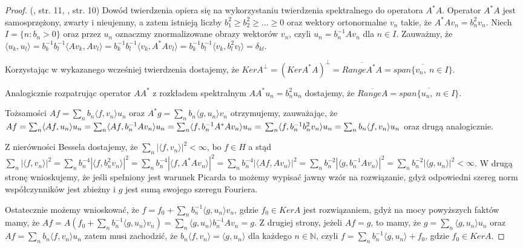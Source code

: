 \documentclass[man,mfiu]{mgrwms}
\begin{document}
\begin{proof}(\cite{kaipo}, str. 11, \cite{szkutnik}, str. 10) Dowód twierdzenia opiera się na wykorzystaniu twierdzenia spektralnego do operatora $A^*A$. Operator $A^*A$ jest samosprzężony, zwarty i nieujemny, a zatem istnieją liczby $b_1^2\geq b_2^2\geq\dots\geq 0$ oraz wektory ortonormalne $v_n$ takie, że $A^*Av_n=b_n^2v_n$. Niech $I=\{n\colon b_n>0\}$ oraz przez $u_n$ oznaczmy znormalizowane obrazy wektorów $v_n$, czyli $u_n=b_n^{-1}Av_n$ dla $n\in I$. Zauważmy, że $\langle u_k,u_l\rangle=b_k^{-1}b_l^{-1}\langle Av_k, Av_l\rangle=b_k^{-1}b_l^{-1}\langle v_k,A^*Av_l\rangle=b_k^{-1}b_l^{-1}\langle v_k,b_l^2v_l\rangle=\delta_{kl}$.

Korzystając w wykazanego wcześniej twierdzenia dostajemy, że $KerA^{\perp}=(KerA^*A)^{\perp}=\overline{RangeA^*A}=\overline{span\{v_n,\ n\in I\}}$.

Analogicznie rozpatrując operator $AA^*$ z rozkładem spektralnym $AA^*u_n=b_n^2u_n$ dostajemy, że $\overline{RangeA}=\overline{span\{u_n,\ n\in I\}}$.

Tożsamości $Af=\sum_nb_n\langle f, v_n\rangle u_n$ oraz $A^*g=\sum_nb_n\langle g, u_n\rangle v_n$ otrzymujemy, zauważając, że
$Af=\sum_n\langle Af,u_n\rangle u_n=\sum_n\langle Af, b_n^{-1}Av_n\rangle u_n= \sum_n\langle f,b_n^{-1}A^*Av_n\rangle u_n=\\\sum_n\langle f,b_n^{-1}b_n^2v_n\rangle u_n=\sum_n b_n\langle f,v_n\rangle u_n$ oraz drugą analogicznie.

Z nierówności Bessela dostajemy, że $\sum_n|\langle f, v_n\rangle |^2<\infty$, bo $f\in H$ a stąd
$\sum_n|\langle f,v_n\rangle|^2=\sum_nb_n^{-4}|\langle f,b_n^2v_n\rangle|^2=\sum_nb_n^{-4}|\langle f, A^*Av_n\rangle|^2=\sum_nb_n^{-4}|\langle Af,Av_n\rangle|^2=\sum_nb_n^{-2}|\langle g, b_n^{-1}Av_n\rangle|^2=\sum_nb_n^{-2}|\langle g, u_n\rangle|^2<\infty$. W drugą stronę wnioskujemy, że jeśli spełniony jest warunek Picarda to możemy wypisać jawny wzór na rozwiązanie,  gdyż odpowiedni szereg norm współczynników jest zbieżny i $g$ jest sumą swojego szeregu Fouriera.

Ostatecznie możemy wnioskować, że $f=f_0+\sum_nb_n^{-1}\langle g, u_n\rangle v_n$, gdzie $f_0\in KerA$ jest rozwiązaniem, gdyż na mocy powyższych faktów mamy, że $Af=A(f_0+\sum_nb_n^{-1}\langle g, u_n\rangle v_n)=\sum_n\langle g, u_n\rangle b_n^{-1}Av_n=g$. Z drugiej strony, jeżeli $Af=g$, to mamy, że $g=\sum_n\langle g, u_n\rangle u_n$ oraz $Af=\sum_n b_n\langle f, v_n\rangle u_n$ zatem musi zachodzić, że $b_n\langle f, v_n\rangle = \langle g,u_n\rangle $ dla każdego $n\in \mathbb{N}$, czyli $f=\sum_n b_n^{-1}\langle g,u_n\rangle +f_0$, gdzie $f_0\in KerA$.
\end{proof}
\end{document}

